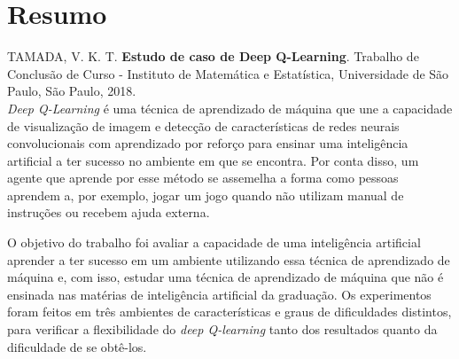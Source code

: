 \chapter*{Resumo}
%
\noindent%
TAMADA, V. K. T. \textbf{Estudo de caso de Deep Q-Learning}. Trabalho de Conclusão de Curso
 - Instituto de Matemática e Estatística, Universidade de São Paulo,
São Paulo, 2018.
\\

\textit{Deep Q-Learning} é uma técnica de aprendizado de máquina que une a capacidade de visualização de imagem e detecção de características de redes neurais convolucionais com aprendizado por reforço para ensinar uma inteligência artificial a ter sucesso no ambiente em que se encontra.
Por conta disso, um agente que aprende por esse método se assemelha a forma como pessoas aprendem a, por exemplo, jogar um jogo quando não utilizam manual de instruções ou recebem ajuda externa.

O objetivo do trabalho foi avaliar a capacidade de uma inteligência artificial aprender a ter sucesso em um ambiente utilizando essa técnica de aprendizado de máquina e, com isso, estudar uma técnica de aprendizado de máquina que não é ensinada nas matérias de inteligência artificial da graduação.
Os experimentos foram feitos em três ambientes de características e graus de dificuldades distintos, para verificar a flexibilidade do \textit{deep Q-learning} tanto dos resultados quanto da dificuldade de se obtê-los.

\\



